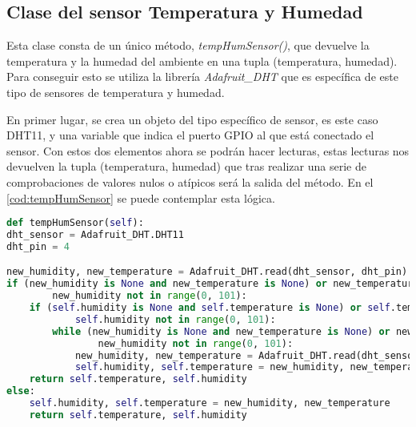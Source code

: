 \subsection{Clase del sensor Temperatura y Humedad}
Esta clase consta de un único método, \textit{tempHumSensor()}, que devuelve la temperatura y la humedad del ambiente en una tupla (temperatura, humedad). Para conseguir esto se utiliza la librería \textit{Adafruit\_DHT} \cite{noauthor_dht_nodate} que es específica de este tipo de sensores de temperatura y humedad.

En primer lugar, se crea un objeto del tipo específico de sensor, es este caso DHT11, y una variable que indica el puerto GPIO al que está conectado el sensor. Con estos dos elementos ahora se podrán hacer lecturas, estas lecturas nos devuelven la tupla (temperatura, humedad) que tras realizar una serie de comprobaciones de valores nulos o atípicos será la salida del método. En el \autoref{cod:tempHumSensor} se puede contemplar esta lógica.
\begin{lstlisting}[language=Python, label=cod:tempHumSensor, caption=Lectura de la temperatura y humedad]
def tempHumSensor(self):
dht_sensor = Adafruit_DHT.DHT11
dht_pin = 4

new_humidity, new_temperature = Adafruit_DHT.read(dht_sensor, dht_pin)
if (new_humidity is None and new_temperature is None) or new_temperature not in range(0, 101) or \
        new_humidity not in range(0, 101):
    if (self.humidity is None and self.temperature is None) or self.temperature not in range(0, 101) or \
            self.humidity not in range(0, 101):
        while (new_humidity is None and new_temperature is None) or new_temperature not in range(0, 101) or \
                new_humidity not in range(0, 101):
            new_humidity, new_temperature = Adafruit_DHT.read(dht_sensor, dht_pin)
            self.humidity, self.temperature = new_humidity, new_temperature
    return self.temperature, self.humidity
else:
    self.humidity, self.temperature = new_humidity, new_temperature
    return self.temperature, self.humidity  
\end{lstlisting}

